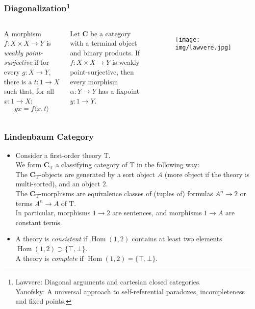 \documentclass[UTF8,11pt,colorlinks,compress,openany]{beamer}%
\begin{document}
\begin{frame}\frametitle{Diagonalization\footnote{\tiny Lawvere: Diagonal arguments and cartesian closed categories.\\
Yanofsky: A universal approach to self-referential paradoxes, incompleteness and fixed points.}}
\setlength\abovedisplayskip{0pt}
\setlength\belowdisplayskip{0pt}
\begin{columns}
\begin{definition}
A morphism $f: X\times X\to Y$ is \emph{weakly point-surjective} if for every $g: X\to Y$, there is a $t: 1\to X$ such that, for all $x: 1\to X$:
\[gx=f\langle x,t\rangle\]
\end{definition}
	\begin{theorem}
		Let $\mathbf{C}$ be a category with a terminal object and binary products. If $f: X\times X\to Y$ is weakly point-surjective, then every morphism $\alpha: Y\to Y$ has a fixpoint $y: 1\to Y$.
	\end{theorem}
	\begin{figure}
		\texttt{[image: img/lawvere.jpg]}
	\end{figure}
\end{columns}
\end{frame}

\begin{frame}\frametitle{Lindenbaum Category}
\begin{itemize}
	\item Consider a first-order theory $\mathrm{T}$.\\
	We form $\mathbf{C}_\mathrm{T}$ a classifying category of $\mathrm{T}$ in the following way:\\
	The $\mathbf{C}_\mathrm{T}$-objects are generated by a sort object $A$ (more object if the theory is multi-sorted), and an object $2$.\\
	The $\mathbf{C}_\mathrm{T}$-morphisms are equivalence classes of (tuples of) formulas $A^n\to 2$ or terms $A^n\to A$ of $\mathrm{T}$.\\
	In particular, morphisms $1\to 2$ are sentences, and morphisms $1\to A$ are constant terms.
	\item A theory is \emph{consistent} if $\operatorname{Hom}(1,2)$ contains at least two elements $\operatorname{Hom}(1,2)\supset\{\top,\bot\}$.\\
	A theory is \emph{complete} if $\operatorname{Hom}(1,2)=\{\top,\bot\}$.
\end{itemize}
\end{frame}
\end{document}
